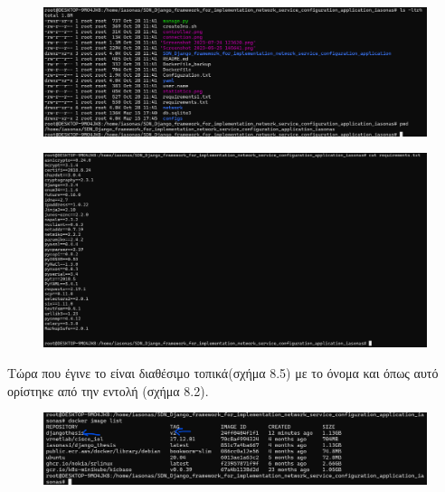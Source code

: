 \begin{figure}[h]
	\centering
	\includegraphics[width=1.0\textwidth]{graphics/dockerfile_location.png}
	\caption{}
\end{figure}

\FloatBarrier

\FloatBarrier

\begin{figure}[h]
	\centering
	\includegraphics[width=1.0\textwidth]{graphics/requirements.png}
	\caption{}
\end{figure}

\FloatBarrier

\noindent Τώρα που έγινε  το  είναι διαθέσιμο τοπικά(σχήμα 8.5) με το όνομα  και  όπως αυτό ορίστηκε από την εντολή (σχήμα 8.2).

\FloatBarrier


\begin{figure}[h]
	\centering
	\includegraphics[width=1.0\textwidth]{graphics/docker_image_list_2.png}
	\caption{}
\end{figure}

